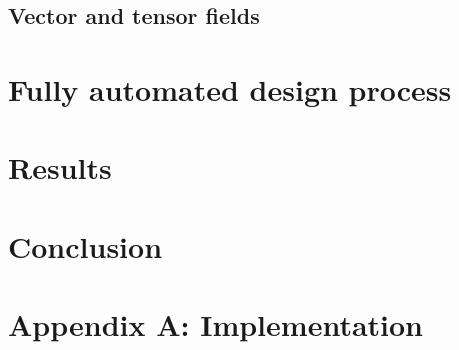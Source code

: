 \documentclass{article}
\newcommand{\inhoud}[1]{\textcolor{blue}{\textbf{\newline Summary: }\it{#1}}}
\newcommand{\voegtoe}[1]{\textcolor{MyDarkGreen}{\textbf{-Insert: }\it{#1}}}
\begin{document}


\subsection{Vector and tensor fields}




\section{Fully automated design process} 


\section{Results}

\section{Conclusion}

\newpage
\section*{Appendix A: Implementation}
\newpage


\newpage 
\end{document}
